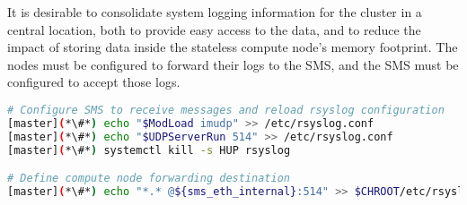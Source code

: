 It is desirable to consolidate system logging information for the cluster in a
central location, both to provide easy access to the data, and to reduce the
impact of storing data inside the stateless compute node's memory footprint. The
nodes must be configured to forward their logs to the SMS, and the SMS must be 
configured to accept those logs.

\begin{lstlisting}[language=bash,keywords={}]
# Configure SMS to receive messages and reload rsyslog configuration
[master](*\#*) echo "$ModLoad imudp" >> /etc/rsyslog.conf
[master](*\#*) echo "$UDPServerRun 514" >> /etc/rsyslog.conf
[master](*\#*) systemctl kill -s HUP rsyslog

# Define compute node forwarding destination
[master](*\#*) echo "*.* @${sms_eth_internal}:514" >> $CHROOT/etc/rsyslog.conf
\end{lstlisting}
